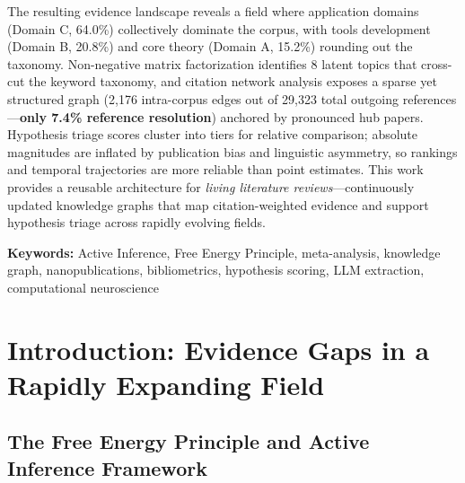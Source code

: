 \documentclass[
  english,
]{article}
\begin{document}
The resulting evidence landscape reveals a field where application
domains (Domain C, 64.0\%) collectively dominate the corpus, with tools
development (Domain B, 20.8\%) and core theory (Domain A, 15.2\%)
rounding out the taxonomy. Non-negative matrix factorization identifies
8 latent topics that cross-cut the keyword taxonomy, and citation
network analysis exposes a sparse yet structured graph (2,176
intra-corpus edges out of 29,323 total outgoing
references---\textbf{only 7.4\% reference resolution}) anchored by
pronounced hub papers. Hypothesis triage scores cluster into tiers for
relative comparison; absolute magnitudes are inflated by publication
bias and linguistic asymmetry, so rankings and temporal trajectories are
more reliable than point estimates. This work provides a reusable
architecture for \emph{living literature reviews}---continuously updated
knowledge graphs that map citation-weighted evidence and support
hypothesis triage across rapidly evolving fields.

\textbf{Keywords:} Active Inference, Free Energy Principle,
meta-analysis, knowledge graph, nanopublications, bibliometrics,
hypothesis scoring, LLM extraction, computational neuroscience

\newpage

\section{Introduction: Evidence Gaps in a Rapidly Expanding
Field}\label{introduction-evidence-gaps-in-a-rapidly-expanding-field}

\subsection{The Free Energy Principle and Active Inference
Framework}\label{the-free-energy-principle-and-active-inference-framework}
\end{document}
